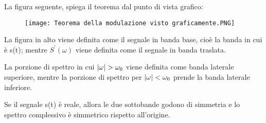 La figura seguente, spiega il teorema dal punto di vista grafico: 

\begin{figure}[h]
    \centering
    \texttt{[image: Teorema della modulazione visto graficamente.PNG]}
\end{figure}  

La figura in alto viene definita come il segnale in banda base, cioè la banda in cui è s(t);  
mentre $S^{'} (\omega)$ viene definita come il segnale in banda traslata. \newline 

La porzione di spettro in cui $\abs{\omega} > \omega_0$  viene definita come banda laterale superiore, 
mentre la porzione di spettro per $\abs{\omega} < \omega_0$ prende la banda laterale inferiore. \newline 

Se il segnale s(t) è reale, allora le due sottobande godono di simmetria e lo spettro complessivo è simmetrico rispetto all'origine. \newline 

\newpage 
